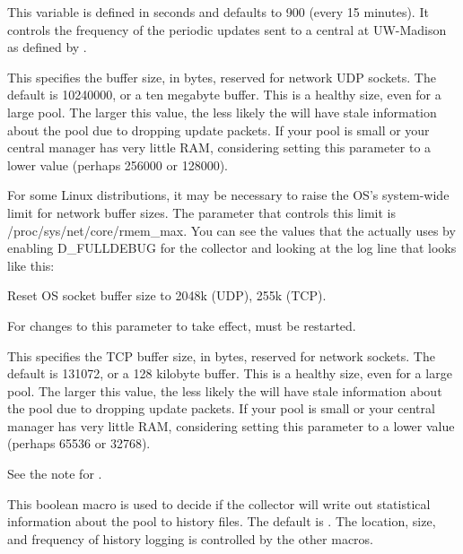 \begin{description}
\label{param:CollectorUpdateInterval}
\item[\Macro{COLLECTOR\_UPDATE\_INTERVAL}]
  This variable is defined in seconds and defaults to 900 (every 15 minutes).
  It controls the frequency of the periodic
  updates sent to a central  at UW-Madison as
  defined by .

\label{param:CollectorSocketBufsize}
\item[\Macro{COLLECTOR\_SOCKET\_BUFSIZE}] 
  This specifies the buffer size, in
  bytes, reserved for  network UDP sockets.  The default is
  10240000, or a ten megabyte buffer.  This is a healthy size, even for a large
  pool.  The larger this value, the less likely the  will
  have stale information about the pool due to dropping update packets.  If
  your pool is small or your central manager has very little RAM, considering
  setting this parameter to a lower value (perhaps 256000 or 128000).

  \Note For some Linux distributions, it may be necessary to raise the
  OS's system-wide limit for network buffer sizes. The parameter that
  controls this limit is /proc/sys/net/core/rmem\_max. You can see the
  values that the  actually uses by enabling D\_FULLDEBUG
  for the collector and looking at the log line that looks like this:

  Reset OS socket buffer size to 2048k (UDP), 255k (TCP).

  For changes to this parameter to take effect,  must
  be restarted.

\label{param:CollectorTcpSocketBufsize}
\item[\Macro{COLLECTOR\_TCP\_SOCKET\_BUFSIZE}]
  This specifies the TCP buffer
  size, in  bytes, reserved for  network sockets.  The
  default is 131072, or a 128 kilobyte buffer.  This is a healthy size, even
  for a large pool.  The larger this value, the less likely the
   will have stale information about the pool due to
  dropping update packets.  If your pool is small or your central
  manager has very little RAM, considering setting this parameter to a
  lower value (perhaps 65536 or 32768).

  \Note See the note for .

\label{param:KeepPoolHistory}
\item[\Macro{KEEP\_POOL\_HISTORY}]
  This boolean macro is used to decide if the collector will write
  out statistical information about the pool to history files.
  The default is .
  The location, size, and frequency of history logging is controlled
  by the other macros.


\end{description}

